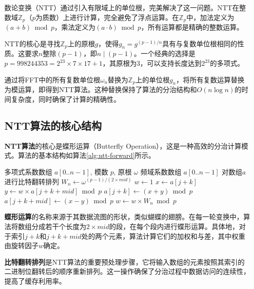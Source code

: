 \documentclass[a4paper]{article}
\begin{document}
数论变换（NTT）通过引入有限域上的单位根，完美解决了这一问题。NTT在整数域$\mathbb{Z}_p$（$p$为质数）上进行计算，完全避免了浮点运算。在$\mathbb{Z}_p$中，加法定义为$(a + b) \bmod p$，乘法定义为$(a \cdot b) \bmod p$，所有运算都是精确的整数运算。

NTT的核心是寻找$\mathbb{Z}_p$上的原根$g$，使得$g_n = g^{(p-1)/n}$具有与复数单位根相同的性质。这要求$n$整除$(p-1)$，即$n \mid (p-1)$。一个经典的选择是$p = 998244353 = 2^{23} \times 7 \times 17 + 1$，其原根为$3$，可以支持长度达到$2^{23}$的多项式。

通过将FFT中的所有复数单位根$\omega_n$替换为$\mathbb{Z}_p$上的单位根$g_n$，将所有复数运算替换为模运算，即得到NTT算法。这种替换保持了算法的分治结构和$O(n\log n)$的时间复杂度，同时确保了计算的精确性。

\subsection{NTT算法的核心结构}

\textbf{NTT算法}的核心是蝶形运算（Butterfly Operation），这是一种高效的分治计算模式。算法的基本结构如算法\ref{alg:ntt-forward}所示。

\begin{algorithm}[htbp]
\caption{NTT前向变换算法}
\label{alg:ntt-forward}
\begin{algorithmic}[1]
\Require 多项式系数数组 $a[0..n-1]$, 模数 $p$, 原根 $\omega$
\Ensure 频域系数数组 $a[0..n-1]$
\State 对数组$a$进行比特翻转排列
    \State $W_n \gets \omega^{(p-1)/(2 \times mid)}$
        \State $w \gets 1$
            \State $x \gets a[j + k]$
            \State $y \gets w \times a[j + k + mid] \bmod p$
            \State $a[j + k] \gets (x + y) \bmod p$
            \State $a[j + k + mid] \gets (x - y) \bmod p$
            \State $w \gets w \times W_n \bmod p$
        \EndFor
    \EndFor
\EndFor
\end{algorithmic}
\end{algorithm}

\textbf{蝶形运算}的名称来源于其数据流图的形状，类似蝴蝶的翅膀。在每一轮变换中，算法将数组分成若干个长度为$2 \times mid$的段，在每个段内进行蝶形运算。具体地，对于索引$j+k$和$j+k+mid$处的两个元素，算法计算它们的加权和与差，其中权重由旋转因子$w$确定。

\textbf{比特翻转排列}是NTT算法的重要预处理步骤，它将输入数组的元素按照其索引的二进制位翻转后的顺序重新排列。这一操作确保了分治过程中数据访问的连续性，提高了缓存利用率。
\end{document}
